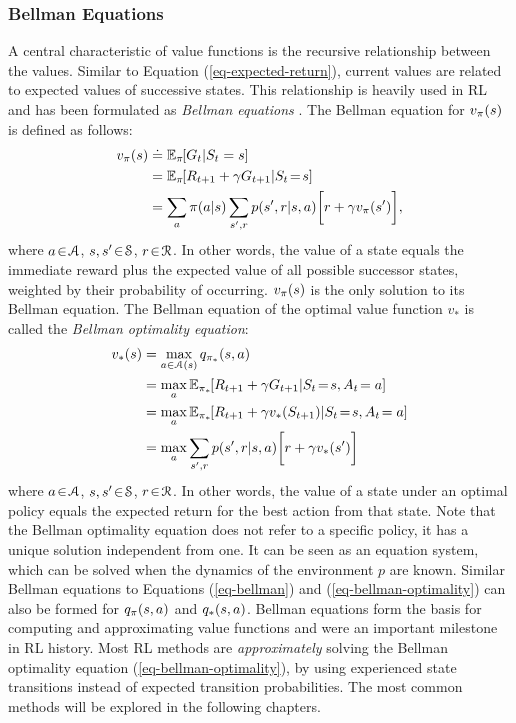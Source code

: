 \documentclass[a4paper, twoside, 12pt]{article}
\let\cite\shortcite
\begin{document}
\subsubsection{Bellman Equations}
\label{sec:orgb241b05}
A central characteristic of value functions is the recursive relationship
between the values. Similar to Equation (\ref{eq-expected-return}), current values are
related to expected values of successive states. This relationship is heavily
used in RL and has been formulated as \emph{Bellman equations}
\cite{bellman57_dynam_progr}. The Bellman equation for \(\vpi(s)\) is defined as
follows:
\begin{equation} \label{eq-bellman}
\begin{split}
    \vpi(s) &\defeq \EE{\pi}{G_t|S_t=s} \\
    &= \EE{\pi}{R_{t+1}+\gamma G_{t+1}|S_t\!=\!s} \\
    &= \sum_{a}{\pi(a|s)}\sum_{s',r}{p(s',r|s,a)}\bigg[r+\gamma\vpi(s')\bigg],
\end{split}
\end{equation}
where \(a\!\in\!\A\), \(s,s'\!\in\!\S\), \(r\!\in\!\R\).
In other words, the value of a state equals the immediate reward plus the
expected value of all possible successor states, weighted by their probability
of occurring. \(\vpi(s)\) is the only solution to its Bellman equation. The
Bellman equation of the optimal value function \(v_*\) is called the \emph{Bellman
optimality equation}:
\begin{equation} \label{eq-bellman-optimality}
\begin{split}
    \vstar(s) &= \max_{a\in\A(s)}q_{\pi_*}(s,a) \\
    &= \max_{a}\EE{\pi_*}{R_{t+1}+\gamma G_{t+1}|S_t\!=\!s, A_t\!=a} \\
    &= \max_{a}\EE{\pi_*}{R_{t+1}+\gamma \vstar(S_{t+1})|S_t\!=\!s, A_t\!=a} \\
    &= \max_{a}\sum_{s',r}{p(s',r|s,a)}\bigg[r+\gamma\vstar(s')\bigg]
\end{split}
\end{equation}
where \(a\!\in\!\A\), \(s,s'\!\in\!\S\), \(r\!\in\!\R\). In other words, the value of
a state under an optimal policy equals the expected return for the best action
from that state. Note that the Bellman optimality equation does not refer to a
specific policy, it has a unique solution independent from one. It can be seen
as an equation system, which can be solved when the dynamics of the environment
\(p\) are known. Similar Bellman equations to Equations (\ref{eq-bellman}) and
(\ref{eq-bellman-optimality}) can also be formed for \(\qpi(s,a)\) and
\(\qstar(s,a)\). Bellman equations form the basis for computing and approximating
value functions and were an important milestone in RL history. Most RL methods
are \emph{approximately} solving the Bellman optimality equation
(\ref{eq-bellman-optimality}), by using experienced state transitions instead of
expected transition probabilities. The most common methods will be explored in
the following chapters.
\end{document}
